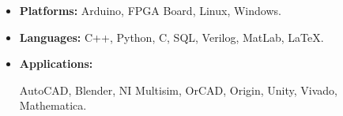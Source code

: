 \begin{itemize}
    \item 
    \textbf{Platforms:} Arduino, FPGA Board, Linux, Windows.
    \item 
    \textbf{Languages:} C++, Python, C, SQL, Verilog, MatLab, \LaTeX.
    \item 
    \textbf{Applications:} 
    \begin{minipage}[t]{\skillwidth}
        AutoCAD, Blender, NI Multisim, OrCAD, Origin, 
        Unity, Vivado, Mathematica.
    \end{minipage}
\end{itemize}
